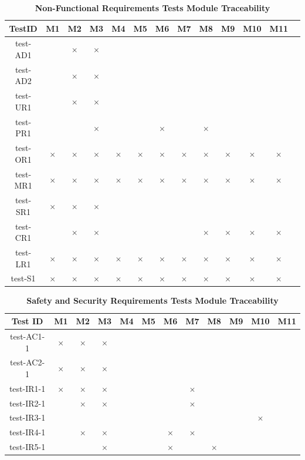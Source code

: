 \documentclass[12pt, titlepage]{article}
\begin{document}
\begin{table} [H]
  \centering
  \begin{tabular}{|c|c|c|c|c|c|c|c|c|c|c|c|c|}
    \hline
    TestID & M1 & M2 & M3 & M4 & M5 & M6 & M7 & M8 & M9 & M10 & M11 \\
    \hline
    test-AD1 & & $\times$ & $\times$ & & & & & & & &\\
    \hline
    test-AD2 & & $\times$ & $\times$ & & & & & & & &\\
    \hline
    test-UR1 & & $\times$ & $\times$ & & & & & & & & \\
    \hline
    test-PR1 & & & $\times$ & & & $\times$ & & $\times$ & & & \\
    \hline
    test-OR1 & $\times$ & $\times$ & $\times$ & $\times$ & $\times$ & $\times$ & $\times$ & $\times$ & $\times$ & $\times$ & $\times$  \\
    \hline
    test-MR1 & $\times$ & $\times$ & $\times$ & $\times$ & $\times$ & $\times$ & $\times$ & $\times$ & $\times$ & $\times$ & $\times$ \\
    \hline
    test-SR1 & $\times$ & $\times$ & $\times$ & & & & & & & &  \\
    \hline
    test-CR1 & & $\times$ & $\times$ & & & & & $\times$ & $\times$ & $\times$ & $\times$ \\
    \hline
    test-LR1 & $\times$ & $\times$ & $\times$ & $\times$ & $\times$ & $\times$ & $\times$ & $\times$ & $\times$ & $\times$ & $\times$ \\
    \hline
    test-S1 & $\times$ & $\times$ & $\times$ & $\times$ & $\times$ & $\times$ & $\times$ & $\times$ & $\times$ & $\times$ & $\times$ \\
    \hline
  \end{tabular}
\caption{\bf Non-Functional Requirements Tests Module Traceability} \label{tab:nfr-test-traceability}
\end{table}

\begin{table} [H]
  \centering
  \begin{tabular}{|c|c|c|c|c|c|c|c|c|c|c|c|}
  \hline
  Test ID & M1 & M2 & M3 & M4 & M5 & M6 & M7 & M8 & M9 & M10 & M11 \\
  \hline
  test-AC1-1 & $\times$ & $\times$ & $\times$ & & & & & & & & \\
  \hline
  test-AC2-1 & $\times$ & $\times$ & $\times$ & & & & & & & & \\
  \hline
  test-IR1-1 & $\times$ & $\times$ & $\times$ & & & & $\times$ & & & & \\
  \hline
  test-IR2-1 & & $\times$ & $\times$ & & & & $\times$ & & & & \\
  \hline
  test-IR3-1 & & & & & & & & & & $\times$ &\\
  \hline
  test-IR4-1 & & $\times$ & $\times$ & & & $\times$ & $\times$ & & & & \\
  \hline
  test-IR5-1 & & & $\times$ & & & $\times$ & & $\times$ & & & \\
  \hline
\end{tabular}
\caption{\bf Safety and Security Requirements Tests Module Traceability} \label{tab:sns-test-traceability}
\end{table}
\end{document}
